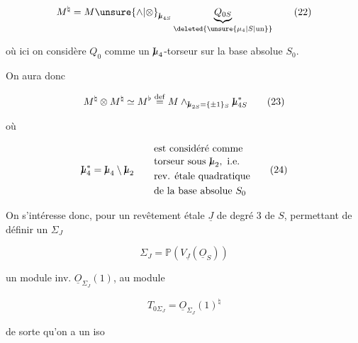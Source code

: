 \[
M^\natural=M\unsure{\wedge|\otimes}_{\mathord{\mathrm{I}\mkern-7mu\mu}_{4S}}\underbrace{Q_{0S}}_{\deleted{\unsure{\mu_4|S|\text{un}}}}
\tag*{(22)}
\]


où ici on considère $Q_0$ comme un $\mathord{\mathrm{I}\mkern-7mu\mu}_4$-torseur sur la base absolue $S_0$.

On aura donc

\[
M^\natural\otimes M^\natural\simeq M^\flat\overset{\mathrm{def}}{=}M\wedge_{\mathord{\mathrm{I}\mkern-7mu\mu}_{2S}=\{\pm1\}_S}\mathord{\mathrm{I}\mkern-7mu\mu}_{4S}^*
\tag*{(23)}
\]

où 

\[
\mathord{\mathrm{I}\mkern-7mu\mu}_4^*=\mathord{\mathrm{I}\mkern-7mu\mu}_4\setminus\mathord{\mathrm{I}\mkern-7mu\mu}_2
\qquad\begin{aligned}
&\text{est considéré comme}\\[-2pt]
&\text{torseur sous }\mathord{\mathrm{I}\mkern-7mu\mu}_2,\ \text{i.e.}\\
&\text{rev. étale quadratique}\\
&\text{de la base absolue }S_0
\end{aligned}
\tag*{(24)}
\]

On s'intéresse donc,  pour un revêtement
étale $\underline J$ de degré $3$ de $S$, permettant de définir un $\Sigma_J$

\[
\Sigma_J=\mathbb P(V_{\underline J}(\underline O_S))
\tag*{(25)}
\]


 un module inv. $\underline O_{\Sigma_J}(1)$,  au module

\[
T_{0\Sigma_J}=\underline O_{\Sigma_J}(1)^{\natural}
\tag*{(26)}
\]

de sorte qu'on a un iso

